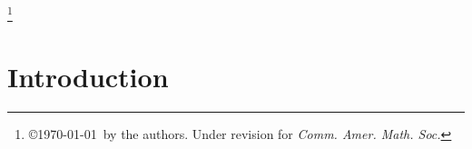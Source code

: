 \documentclass[12pt]{amsart}
\begin{document}
\thanks{\copyright \today\ by the authors. Under revision for \em Comm. Amer. Math. Soc.}
\begin{abstract}
We initiate the development of a theory of the negative homogeneity $p$-d'Alembert operator in the smooth setting. We relate it to a Bochner-Ohta identity of homogeneity of $2p-2<0$.
We identify conditions under which the unexpected ellipticity of this operator turns out to be uniform.
We exploit 
this to give
a new proof of the Eschenburg, Galloway and Newman splitting theorems from Lorentzian geometry, which allows us bring them into a framework closer to the Cheeger-Gromoll splitting theorem from Riemannian geometry.  
\end{abstract}

\maketitle

\tableofcontents

\section{Introduction}
\end{document}
